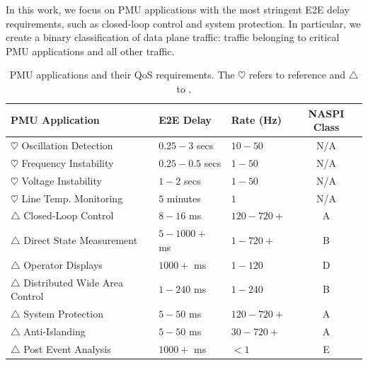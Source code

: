 In this work, we focus on PMU applications with the most stringent E2E delay requirements, such as closed-loop control and system protection. 
In particular, we create a binary classification of data plane traffic: traffic belonging to critical PMU applications and all other traffic. 



\begin{table}[t]
\begin{center}
\begin{tabular}{|l|l|l|c|} 
\hline
   	{\bf PMU Application} & {\bf E2E Delay} & {\bf Rate (Hz)} & {\bf NASPI Class} \\ 
		  \hline \hline
		
			$\heartsuit$ Oscillation Detection & $0.25 - 3$ secs & $10-50$  & N/A \\
			$\heartsuit$  Frequency Instability & $0.25-0.5$ secs & $1-50$ & N/A  \\
			$\heartsuit$  Voltage Instability & $1-2$ secs &  $1-50$  & N/A  \\
			$\heartsuit$  Line Temp. Monitoring & $5$ minutes & $1$ & N/A  \\
			\hline
			$\triangle$ Closed-Loop Control & $8-16$ ms & $120-720+$ & A \\ 
			$\triangle$  Direct State Measurement & $5-1000+$ ms & $1-720+$  & B \\
			$\triangle$ Operator Displays & $1000+$ ms & $1-120$ & D \\
			$\triangle$ Distributed Wide Area Control & $1-240$ ms & $1-240$  & B  \\
			$\triangle$ System Protection & $5-50$ ms & $120-720+$  & A  \\
			$\triangle$  Anti-Islanding & $5-50$ ms & $30-720+$  & A  \\
			$\triangle$  Post Event Analysis & $1000+$ ms & $< 1$ & E \\
			\hline
			\end{tabular}
			\end{center}
\caption{PMU applications and their QoS requirements.  The $\heartsuit$ refers to reference \cite{Kth09} and $\triangle$ to \cite{Bakken11}. }
\label{tab:app-requirements}
\end{table}


